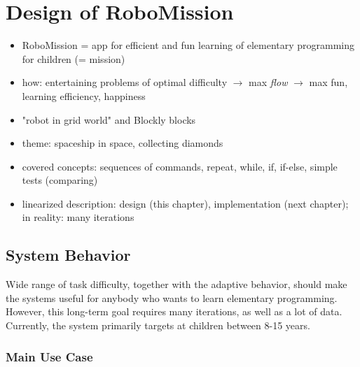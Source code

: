 \chapter{Design of RoboMission}
\label{chap:design-of-robomission}

\begin{itemize}
\item RoboMission = app for efficient and fun learning of elementary programming for children (= mission)
\item how: entertaining problems of optimal difficulty $\rightarrow$ max \emph{flow} $\rightarrow$ max fun, learning efficiency, happiness
\item "robot in grid world" and Blockly blocks
\item theme: spaceship in space, collecting diamonds
\item covered concepts: sequences of commands, repeat, while, if, if-else, simple tests (comparing)
\item linearized description: design (this chapter), implementation (next chapter); in reality: many iterations
\end{itemize}




\section{System Behavior}
\label{sec:robomission.behavior}

Wide range of task difficulty, together with the adaptive behavior,
should make the systems useful for anybody who wants to learn
elementary programming.
However, this long-term goal requires many iterations,
as well as a lot of data.
Currently, the system primarily targets at children between 8-15 years.

\subsection{Main Use Case}
\label{sec:robomission.use-case}

